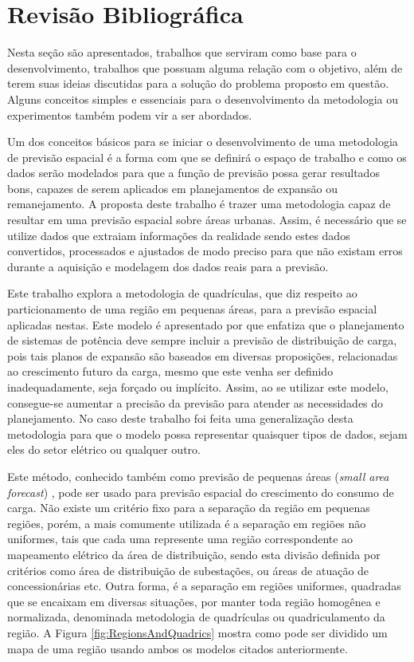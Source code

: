 \section{Revisão Bibliográfica}

Nesta seção são apresentados, trabalhos que serviram como base para o desenvolvimento, trabalhos que possuam alguma relação com o objetivo, além de terem suas ideias discutidas para a solução do problema proposto em questão. Alguns conceitos simples e essenciais para o desenvolvimento da metodologia ou experimentos também podem vir a ser abordados.

Um dos conceitos básicos para se iniciar o desenvolvimento de uma metodologia de previsão espacial é a forma com que se definirá o espaço de trabalho e como os dados serão modelados para que a função de previsão possa gerar resultados bons, capazes de serem aplicados em planejamentos de expansão ou remanejamento. A proposta deste trabalho é trazer uma metodologia capaz de resultar em uma previsão espacial sobre áreas urbanas. Assim, é necessário que se utilize dados que extraiam informações da realidade sendo estes dados convertidos, processados e ajustados de modo preciso para que não existam erros durante a aquisição e modelagem dos dados reais para a previsão.

Este trabalho explora a metodologia de quadrículas, que diz respeito ao particionamento de uma região em pequenas áreas, para a previsão espacial aplicadas nestas. Este modelo é apresentado por \citeauthor{arango1993mthesis} \cite{arango1993mthesis} que enfatiza que o planejamento de sistemas de potência deve sempre incluir a previsão de distribuição de carga, pois tais planos de expansão são baseados em diversas proposições, relacionadas ao crescimento futuro da carga, mesmo que este venha ser definido inadequadamente, seja forçado ou implícito. Assim, ao se utilizar este modelo, consegue-se aumentar a precisão da previsão para atender as necessidades do planejamento. No caso deste trabalho foi feita uma generalização desta metodologia para que o modelo possa representar quaisquer tipos de dados, sejam eles do setor elétrico ou qualquer outro.

Este método, conhecido também como previsão de pequenas áreas (\emph{small area forecast}) \cite{willis1995spatial}, pode ser usado para previsão espacial do crescimento do consumo de carga. Não existe um critério fixo para a separação da região em pequenas regiões, porém, a mais comumente utilizada é a separação em regiões não uniformes, tais que cada uma represente uma região correspondente ao mapeamento elétrico da área de distribuição, sendo esta divisão definida por critérios como área de distribuição de subestações, ou áreas de atuação de concessionárias etc. Outra forma, é a separação em regiões uniformes, quadradas que se encaixam em diversas situações, por manter toda região homogênea e normalizada, denominada metodologia de quadrículas ou quadriculamento da região. A Figura \ref{fig:RegionsAndQuadrics} mostra como pode ser dividido um mapa de uma região usando ambos os modelos citados anteriormente. 

